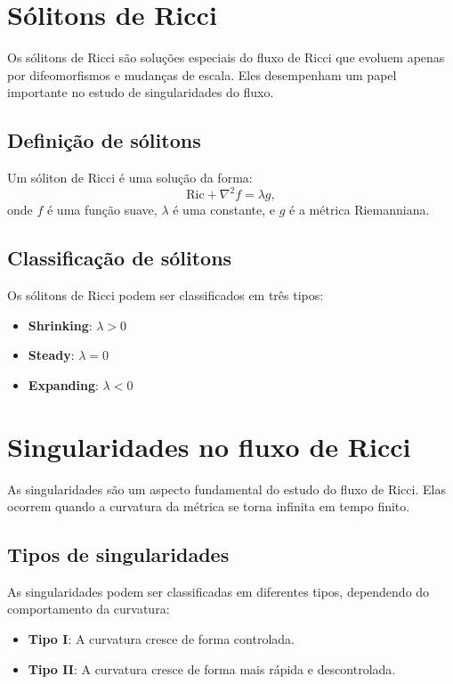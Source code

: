 \section{Sólitons de Ricci}

Os sólitons de Ricci são soluções especiais do fluxo de Ricci que evoluem apenas por difeomorfismos e mudanças de escala. Eles desempenham um papel importante no estudo de singularidades do fluxo.

\subsection{Definição de sólitons}

Um sóliton de Ricci é uma solução da forma:
\[
\mathrm{Ric} + \nabla^2 f = \lambda g,
\]
onde \( f \) é uma função suave, \( \lambda \) é uma constante, e \( g \) é a métrica Riemanniana.

\subsection{Classificação de sólitons}

Os sólitons de Ricci podem ser classificados em três tipos:
\begin{itemize}
    \item \textbf{Shrinking}: \( \lambda > 0 \)
    \item \textbf{Steady}: \( \lambda = 0 \)
    \item \textbf{Expanding}: \( \lambda < 0 \)
\end{itemize}

\section{Singularidades no fluxo de Ricci}

As singularidades são um aspecto fundamental do estudo do fluxo de Ricci. Elas ocorrem quando a curvatura da métrica se torna infinita em tempo finito.

\subsection{Tipos de singularidades}

As singularidades podem ser classificadas em diferentes tipos, dependendo do comportamento da curvatura:
\begin{itemize}
    \item \textbf{Tipo I}: A curvatura cresce de forma controlada.
    \item \textbf{Tipo II}: A curvatura cresce de forma mais rápida e descontrolada.
\end{itemize}

